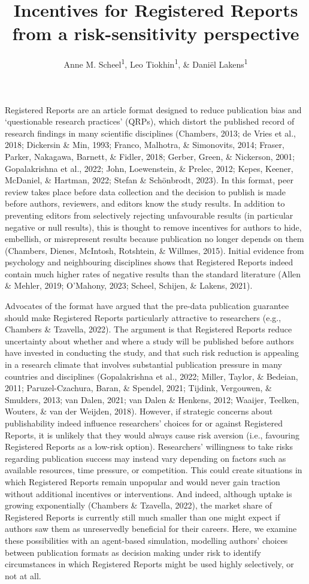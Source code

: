 \documentclass[
  ,man,mask,floatsintext]{apa6}
\title{Incentives for Registered Reports from a risk-sensitivity perspective}
\author{Anne M. Scheel\textsuperscript{1}, Leo Tiokhin\textsuperscript{1}, \& Daniël Lakens\textsuperscript{1}}
\date{}
\affiliation{\vspace{0.5cm}\textsuperscript{1} Eindhoven University of Technology}
\begin{document}
\maketitle

Registered Reports are an article format designed to reduce publication bias and `questionable research practices' (QRPs), which distort the published record of research findings in many scientific disciplines (Chambers, 2013; de Vries et al., 2018; Dickersin \& Min, 1993; Franco, Malhotra, \& Simonovits, 2014; Fraser, Parker, Nakagawa, Barnett, \& Fidler, 2018; Gerber, Green, \& Nickerson, 2001; Gopalakrishna et al., 2022; John, Loewenstein, \& Prelec, 2012; Kepes, Keener, McDaniel, \& Hartman, 2022; Stefan \& Schönbrodt, 2023).
In this format, peer review takes place before data collection and the decision to publish is made before authors, reviewers, and editors know the study results.
In addition to preventing editors from selectively rejecting unfavourable results (in particular negative or null results), this is thought to remove incentives for authors to hide, embellish, or misrepresent results because publication no longer depends on them
(Chambers, Dienes, McIntosh, Rotshtein, \& Willmes, 2015).
Initial evidence from psychology and neighbouring disciplines shows that Registered Reports indeed contain much higher rates of negative results than the standard literature (Allen \& Mehler, 2019; O'Mahony, 2023; Scheel, Schijen, \& Lakens, 2021).

Advocates of the format have argued that the pre-data publication guarantee should make Registered Reports particularly attractive to researchers (e.g., Chambers \& Tzavella, 2022).
The argument is that Registered Reports reduce uncertainty about whether and where a study will be published before authors have invested in conducting the study, and that such risk reduction is appealing
in a research climate that involves substantial publication pressure in many countries and disciplines (Gopalakrishna et al., 2022; Miller, Taylor, \& Bedeian, 2011; Paruzel-Czachura, Baran, \& Spendel, 2021; Tijdink, Vergouwen, \& Smulders, 2013; van Dalen, 2021; van Dalen \& Henkens, 2012; Waaijer, Teelken, Wouters, \& van der Weijden, 2018).
However, if strategic concerns about publishability indeed influence researchers' choices for or against Registered Reports, it is unlikely that they would always cause risk aversion (i.e., favouring Registered Reports as a low-risk option).
Researchers' willingness to take risks regarding publication success may instead vary depending on factors such as available resources, time pressure, or competition.
This could create situations in which Registered Reports remain unpopular and would never gain traction without additional incentives or interventions.
And indeed, although uptake is growing exponentially (Chambers \& Tzavella, 2022), the market share of Registered Reports is currently still much smaller than one might expect if authors saw them as unreservedly beneficial for their careers.
Here, we examine these possibilities with an agent-based simulation, modelling authors' choices between publication formats as decision making under risk to identify circumstances in which Registered Reports might be used highly selectively, or not at all.
\end{document}
